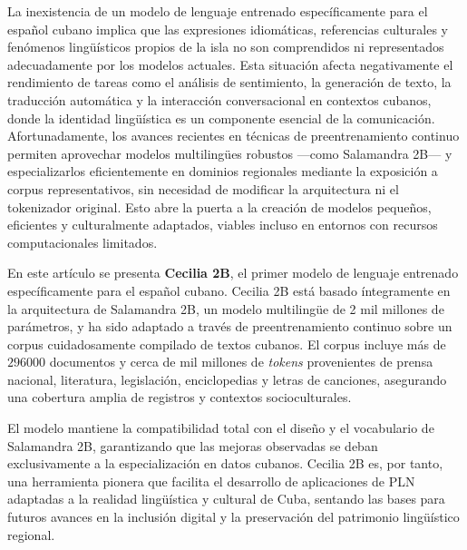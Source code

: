 \documentclass[10pt,twoside]{rcmart} %
\begin{document}
La inexistencia de un modelo de lenguaje entrenado específicamente para el español cubano implica que las expresiones idiomáticas, referencias culturales y fenómenos lingüísticos propios de la isla no son comprendidos ni representados adecuadamente por los modelos actuales. Esta situación afecta negativamente el rendimiento de tareas como el análisis de sentimiento, la generación de texto, la traducción automática y la interacción conversacional en contextos cubanos, donde la identidad lingüística es un componente esencial de la comunicación. Afortunadamente, los avances recientes en técnicas de preentrenamiento continuo permiten aprovechar modelos multilingües robustos —como Salamandra 2B— y especializarlos eficientemente en dominios regionales mediante la exposición a corpus representativos, sin necesidad de modificar la arquitectura ni el tokenizador original. Esto abre la puerta a la creación de modelos pequeños, eficientes y culturalmente adaptados, viables incluso en entornos con recursos computacionales limitados.

En este artículo se presenta \textbf{Cecilia 2B}, el primer modelo de lenguaje entrenado específicamente para el español cubano. Cecilia 2B está basado íntegramente en la arquitectura de Salamandra 2B, un modelo multilingüe de 2 mil millones de parámetros, y ha sido adaptado a través de preentrenamiento continuo sobre un corpus cuidadosamente compilado de textos cubanos. El corpus incluye más de $296000$ documentos y cerca de mil millones de \textit{tokens} provenientes de prensa nacional, literatura, legislación, enciclopedias y letras de canciones, asegurando una cobertura amplia de registros y contextos socioculturales.

El modelo mantiene la compatibilidad total con el diseño y el vocabulario de Salamandra 2B, garantizando que las mejoras observadas se deban exclusivamente a la especialización en datos cubanos. Cecilia 2B es, por tanto, una herramienta pionera que facilita el desarrollo de aplicaciones de PLN adaptadas a la realidad lingüística y cultural de Cuba, sentando las bases para futuros avances en la inclusión digital y la preservación del patrimonio lingüístico regional.

\end{document}
